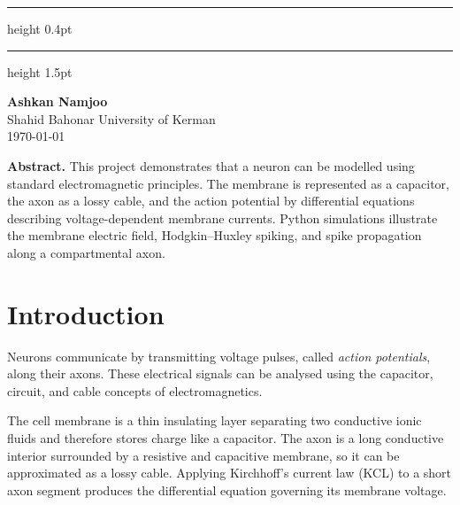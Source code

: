 \documentclass[12pt, a4paper]{article}
\begin{document}
\vspace{1.6cm}

{\color{myblue}\hrule height 0.4pt}
\vspace{0.3cm}
{\color{myborder}\hrule height 1.5pt}

\vspace{1.4cm}

\begin{center}
  {\large\textbf{Ashkan Namjoo}}\\[8pt]
  {\color{mygray}\small Shahid Bahonar University of Kerman}\\[4pt]
  {\color{mygray}\small \today}
\end{center}

\newpage

\begin{tcolorbox}[
  enhanced, colback=mylight, colframe=myborder,
  boxrule=0.8pt, arc=5pt, left=10pt, right=10pt, top=8pt, bottom=8pt,
]
  \textbf{\color{myblue}Abstract.}\quad
  This project demonstrates that a neuron can be modelled using
  standard electromagnetic principles. The membrane is represented
  as a capacitor, the axon as a lossy cable, and the action potential
  by differential equations describing voltage-dependent membrane
  currents. Python simulations illustrate the membrane electric
  field, Hodgkin--Huxley spiking, and spike propagation along a
  compartmental axon.
\end{tcolorbox}

\vspace{0.6cm}

\section{Introduction}

Neurons communicate by transmitting voltage pulses, called
\emph{action potentials}, along their axons. These electrical signals
can be analysed using the capacitor, circuit, and cable concepts of
electromagnetics.

The cell membrane is a thin insulating layer separating two conductive
ionic fluids and therefore stores charge like a capacitor. The axon is
a long conductive interior surrounded by a resistive and capacitive
membrane, so it can be approximated as a lossy cable. Applying
Kirchhoff's current law (KCL) to a short axon segment produces the
differential equation governing its membrane voltage.
\end{document}
